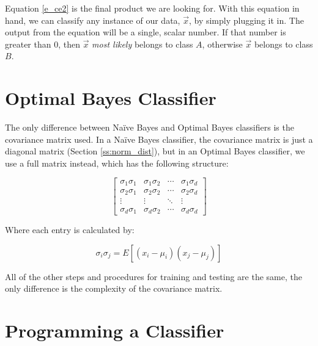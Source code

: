 \documentclass{article}
\begin{document}
Equation \ref{e_ce2} is the final product we are looking for. With this equation
in hand, we can classify any instance of our data, $\vec{x}$, by simply plugging
it in.  The output from the equation will be a single, scalar number. If that
number is greater than $0$, then $\vec{x}$ \emph{most likely} belongs to class
$A$, otherwise $\vec{x}$ belongs to class $B$.


\section{Optimal Bayes Classifier}
\label{sec:obayes}

The only difference between Na\"ive Bayes and Optimal Bayes classifiers
is the covariance matrix used.  In a Na\"ive Bayes classifier, the covariance
matrix is just a diagonal matrix (Section \ref{ss:norm_dist}), but in an
Optimal Bayes classifier, we use a full matrix instead, which has the following
structure:

\begin{displaymath}
\begin{bmatrix} \sigma_1\sigma_1 & \sigma_1\sigma_2 & \cdots & \sigma_1\sigma_d \\
				 \sigma_2\sigma_1 & \sigma_2\sigma_2 & \cdots & \sigma_2\sigma_d \\
				 \vdots & \vdots & \ddots & \vdots \\
				 \sigma_d\sigma_1 & \sigma_d\sigma_2 & \cdots & \sigma_d\sigma_d
\end{bmatrix}
\end{displaymath}

Where each entry is calculated by:

\begin{displaymath}
 \sigma_i\sigma_j = E [{(x_i - \mu_i)(x_j - \mu_j)}]
\end{displaymath}

All of the other steps and procedures for training and testing are the
same, the only difference is the complexity of the covariance matrix.


\section{Programming a Classifier}
\label{sec:tutorial}
\end{document}
